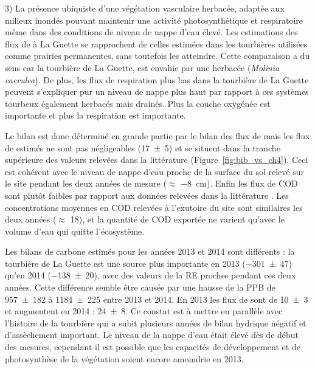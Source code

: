 3) La présence ubiquiste d'une végétation vasculaire herbacée, adaptée aux milieux inondés pouvant maintenir une activité photosynthétique et respiratoire même dans des conditions de niveau de nappe d'eau élevé.
Les estimations des flux de \coo à La Guette se rapprochent de celles estimées dans les tourbières utilisées comme prairies permanentes, sans toutefois les atteindre.
Cette comparaison a du sens car la tourbière de La Guette, est envahie par une herbacée (\textit{Molinia caerulea}).
De plus, les flux de respiration plus bas dans la tourbière de La Guette peuvent s'expliquer pur un niveau de nappe plus haut par rapport à ces systèmes tourbeux également herbacés mais drainés.
Plus la couche oxygénée est importante et plus la respiration est importante.

Le bilan est donc déterminé en grande partie par le bilan des flux de \coo mais les flux de \chh estimés ne sont pas négligeables (\SI{17(5)}{\gcma}) et se situent dans la tranche supérieure des valeurs relevées dans la littérature (Figure~\ref{fig:bib_vs_ch4}). Ceci est cohérent avec le niveau de nappe d'eau proche de la surface du sol relevé sur le site pendant les deux années de mesure ($\approx$ \SI{-8}{\centi\metre}).
Enfin les flux de COD sont plutôt faibles par rapport aux données relevées dans la littérature \citep{koehler2011,vanselow-algan2015}.
Les concentrations moyennes en COD relevées à l'exutoire du site sont similaires les deux années ($\approx$ \SI{18}{\mgl}), et la quantité de COD exportée ne varient qu'avec le volume d'eau qui quitte l'écosystème.

Les bilans de carbone estimés pour les années 2013 et 2014 sont différents : la tourbière de La Guette est une source plus importante en 2013 (\SI{-301(47)}{\gcma}) qu'en 2014 (\SI{-138(20)}{\gcma}), avec des valeurs de la RE proches pendant ces deux années.
Cette différence semble être causée par une hausse de la PPB de \num{957(182)} à \SI{1184(225)}{\gcma} entre 2013 et 2014.
En 2013 les flux de \chh sont de \SI{10(3)}{\gcma} et augmentent en 2014 : \SI{24(8)}{\gcma}.
Ce constat est à mettre en parallèle avec l'histoire de la tourbière qui a subit plusieurs années de bilan hydrique négatif et d'assèchement important.
Le niveau de la nappe d'eau était élevé dès de début des mesures, cependant il est possible que les capacités de développement et de photosynthèse de la végétation soient encore amoindrie en 2013.




